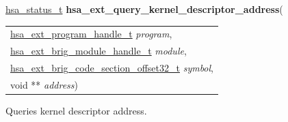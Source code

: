 \documentclass[final]{book}
\newcommand{\hsaarg}[1]{\textit{#1}}
\begin{document}
\noindent\begin{tcolorbox}[breakable,nobeforeafter,colframe=white,colback=lightgray,left=0mm]
\hyperlink{group__status_1gad755322e7ff95456520e8abdbe90d225}{hsa_status_t} \hypertarget{group__HsailLinkerServiceLayer_1ga9ef2c966426619c760dcf042392f91f7}{\textbf{hsa_ext_query_kernel_descriptor_address}}(
\vspace{-3.5mm}\begin{longtable}{@{}p{\textwidth}}
\hspace{1.7em}\hyperlink{group__HsailLinkerServiceLayer_1gaea8d90863414407ddba7e318db7412f9}{hsa_ext_program_handle_t} \hsaarg{program},\\
\hspace{1.7em}\hyperlink{group__FinalizerCoreApi_1ga0216996f5341a8591ecf9e0f6fd1b7e5}{hsa_ext_brig_module_handle_t} \hsaarg{module},\\
\hspace{1.7em}\hyperlink{group__FinalizerCoreApi_1ga494b8ac14a8c10af95b83b51a8a4ad7f}{hsa_ext_brig_code_section_offset32_t} \hsaarg{symbol},\\
\hspace{1.7em}void ** \hsaarg{address})\end{longtable}

\end{tcolorbox}
Queries kernel descriptor address.
\end{document}
